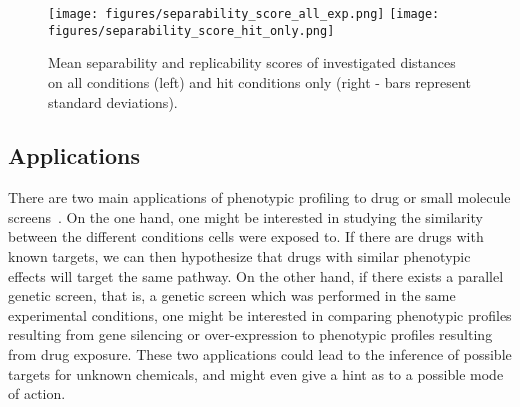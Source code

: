 \begin{figure*}[ht!]
\centerline{
\texttt{[image: figures/separability\_score\_all\_exp.png]}
\texttt{[image: figures/separability\_score\_hit\_only.png]}
}
\caption{Mean separability and replicability scores of investigated distances on all conditions (left) and hit conditions only (right - bars represent standard deviations).}
\label{separability}
\end{figure*}

\subsection{Applications}
\label{sec:applications}
There are two main applications of phenotypic profiling to drug or
small molecule screens~\cite{pmid17401369}. On the one hand, one might
be interested in studying the similarity between the different
conditions cells were exposed to. If there are drugs with known
targets, we can then hypothesize that drugs with similar phenotypic effects
will target the same pathway. 
On the other hand, if there exists a
parallel genetic screen, that is, a genetic screen which was performed
in the same experimental conditions, one might be interested in
comparing phenotypic profiles resulting from gene silencing or
over-expression to phenotypic profiles resulting from drug
exposure. These two applications could lead to the inference of
possible targets for unknown chemicals, and might even give a hint as
to a possible mode of action. 

